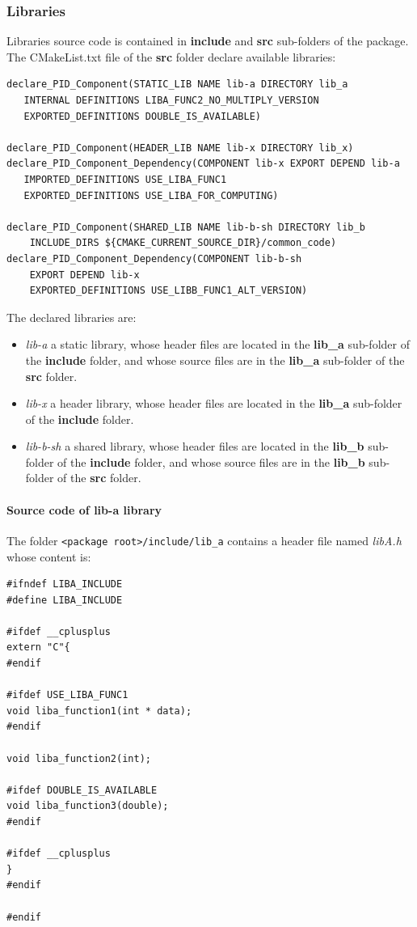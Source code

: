 \documentclass[12pt,a4paper]{article}
\begin{document}
\subsubsection{Libraries}

Libraries source code is contained in \textbf{include} and \textbf{src} sub-folders of the package. The CMakeList.txt file of the \textbf{src} folder declare available libraries:
\begin{verbatim}
declare_PID_Component(STATIC_LIB NAME lib-a DIRECTORY lib_a 
   INTERNAL DEFINITIONS LIBA_FUNC2_NO_MULTIPLY_VERSION 
   EXPORTED_DEFINITIONS DOUBLE_IS_AVAILABLE)

declare_PID_Component(HEADER_LIB NAME lib-x DIRECTORY lib_x)
declare_PID_Component_Dependency(COMPONENT lib-x EXPORT DEPEND lib-a 
   IMPORTED_DEFINITIONS USE_LIBA_FUNC1
   EXPORTED_DEFINITIONS USE_LIBA_FOR_COMPUTING)

declare_PID_Component(SHARED_LIB NAME lib-b-sh DIRECTORY lib_b
    INCLUDE_DIRS ${CMAKE_CURRENT_SOURCE_DIR}/common_code)
declare_PID_Component_Dependency(COMPONENT lib-b-sh 
    EXPORT DEPEND lib-x
    EXPORTED_DEFINITIONS USE_LIBB_FUNC1_ALT_VERSION)
\end{verbatim}

The declared libraries are:
\begin{itemize}
\item \textit{lib-a} a static library, whose header files are located in the \textbf{lib\_a} sub-folder of the \textbf{include} folder, and whose source files are in the \textbf{lib\_a} sub-folder of the \textbf{src} folder.
\item \textit{lib-x} a header library, whose header files are located in the \textbf{lib\_a} sub-folder of the \textbf{include} folder.
\item \textit{lib-b-sh} a shared library, whose header files are located in the \textbf{lib\_b} sub-folder of the \textbf{include} folder, and whose source files are in the \textbf{lib\_b} sub-folder of the \textbf{src} folder.
\end{itemize}

\paragraph{Source code of lib-a library}
The folder \texttt{<package root>/include/lib\_a} contains a header file named \textit{libA.h} whose content is: 
\begin{verbatim}
#ifndef LIBA_INCLUDE
#define LIBA_INCLUDE

#ifdef __cplusplus
extern "C"{
#endif

#ifdef USE_LIBA_FUNC1
void liba_function1(int * data);
#endif

void liba_function2(int);

#ifdef DOUBLE_IS_AVAILABLE
void liba_function3(double);
#endif

#ifdef __cplusplus
}
#endif

#endif
\end{verbatim}
\end{document}
